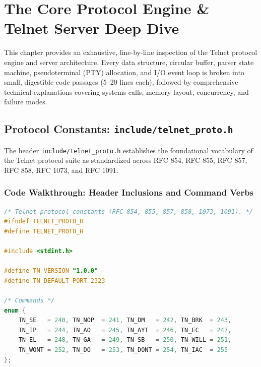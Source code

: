 \chapter{The Core Protocol Engine \& Telnet Server Deep Dive}
\label{chap:server}

This chapter provides an exhaustive, line-by-line inspection of the Telnet protocol engine and server architecture. Every data structure, circular buffer, parser state machine, pseudoterminal (PTY) allocation, and I/O event loop is broken into small, digestible code passages (5--20 lines each), followed by comprehensive technical explanations covering systems calls, memory layout, concurrency, and failure modes.

\section{Protocol Constants: \texttt{include/telnet\_proto.h}}

The header \texttt{include/telnet\_proto.h} establishes the foundational vocabulary of the Telnet protocol suite as standardized across RFC 854, RFC 855, RFC 857, RFC 858, RFC 1073, and RFC 1091.

\subsection{Code Walkthrough: Header Inclusions and Command Verbs}

\begin{lstlisting}[language=C]
/* Telnet protocol constants (RFC 854, 855, 857, 858, 1073, 1091). */
#ifndef TELNET_PROTO_H
#define TELNET_PROTO_H

#include <stdint.h>

#define TN_VERSION "1.0.0"
#define TN_DEFAULT_PORT 2323

/* Commands */
enum {
    TN_SE   = 240, TN_NOP  = 241, TN_DM   = 242, TN_BRK  = 243,
    TN_IP   = 244, TN_AO   = 245, TN_AYT  = 246, TN_EC   = 247,
    TN_EL   = 248, TN_GA   = 249, TN_SB   = 250, TN_WILL = 251,
    TN_WONT = 252, TN_DO   = 253, TN_DONT = 254, TN_IAC  = 255
};
\end{lstlisting}

